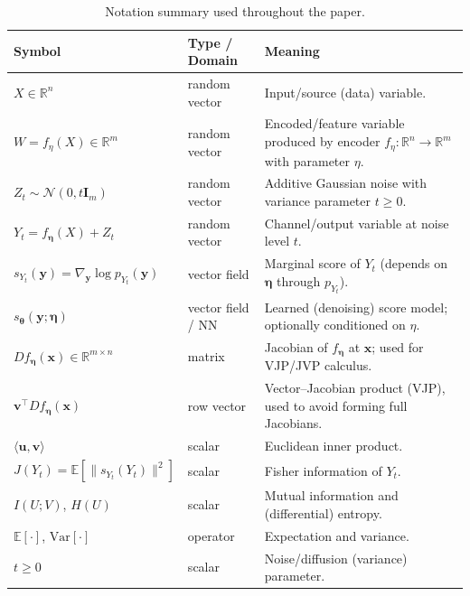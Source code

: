 \documentclass[conference]{IEEEtran}
\begin{document}
\begin{table}[t]
  \centering
  \footnotesize
  \renewcommand{\arraystretch}{1.2}
  \caption{Notation summary used throughout the paper.}
  \label{tab:notation}
  \begin{tabular}{p{} p{} p{}}
  \hline
  \textbf{Symbol} & \textbf{Type / Domain} & \textbf{Meaning} \\
  \hline
  $X \in \mathbb{R}^n$            & random vector            & Input/source (data) variable. \\
  $W = f_{\eta}(X) \in \mathbb{R}^m$ & random vector          & Encoded/feature variable produced by encoder $f_{\eta}\!:\mathbb{R}^n\!\to\!\mathbb{R}^m$ with parameter $\eta$. \\
  $Z_t \sim \mathcal{N}(0, t \bm I_m)$ & random vector            & Additive Gaussian noise with variance parameter $t \ge 0$. \\
  $Y_t = f_{\bm \eta}(X) + Z_t$       & random vector            & Channel/output variable at noise level $t$. \\
  $s_{Y_t}(\bm y) = \nabla_{\bm y} \log p_{Y_t}(\bm y)$ & vector field    & Marginal score of $Y_t$ (depends on $\bm \eta$ through $p_{Y_t}$). \\
  $s_{\bm \theta}(\bm y;\bm \eta)$             & vector field / NN        & Learned (denoising) score model; optionally conditioned on $\eta$. \\
  $D f_{\bm \eta}(\bm x) \in \mathbb{R}^{m\times n}$ & matrix        & Jacobian of $f_{\bm \eta}$ at $\bm x$; used for VJP/JVP calculus. \\
  $\bm v^{\top} D f_{\bm \eta}(\bm x)$         & row vector               & Vector–Jacobian product (VJP), used to avoid forming full Jacobians. \\
  $\langle \bm u, \bm v\rangle$            & scalar                   & Euclidean inner product.\\
  $J(Y_t)=\mathbb{E}[\|s_{Y_t}(Y_t)\|^2]$ & scalar          & Fisher information of $Y_t$. \\
  $I(U;V)$, $H(U)$                 & scalar                   & Mutual information and (differential) entropy. \\
  $\mathbb{E}[\cdot]$, $\mathrm{Var}[\cdot]$ & operator      & Expectation and variance. \\
  $t \ge 0$                        & scalar                   & Noise/diffusion (variance) parameter. \\

\end{tabular}
\end{table}
\end{document}
